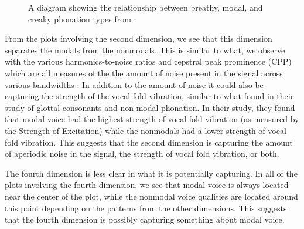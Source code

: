 \begin{figure}[h!]
    \centering
    \caption{A diagram showing the relationship between breathy, modal, and creaky phonation types from \citet{gordonPhonationTypesCrosslinguistic2001}.}
    \label{fig:phonation_types}
\end{figure}

From the plots involving the second dimension, we see that this dimension separates the modals from the nonmodals. This is similar to what, we observe with the various harmonics-to-noise ratios and cepstral peak prominence (CPP) which are all measures of the the amount of noise present in the signal across various bandwidths \citep{dekromCepstrumBasedTechniqueDetermining1993,hillenbrandAcousticCorrelatesBreathy1996,blankenshipTimingNonmodalPhonation2002,ferrerriesgoWhatMakesCepstral2020}. In addition to the amount of noise it could also be capturing the strength of the vocal fold vibration, similar to what \citet{garellekVoicingGlottalConsonants2021} found in their study of glottal consonants and non-modal phonation. In their study, they found that modal voice had the highest strength of vocal fold vibration (as measured by the Strength of Excitation) while the nonmodals had a lower strength of vocal fold vibration. This suggests that the second dimension is capturing the amount of aperiodic noise in the signal, the strength of vocal fold vibration, or both.

The fourth dimension is less clear in what it is potentially capturing. In all of the plots involving the fourth dimension, we see that modal voice is always located near the center of the plot, while the nonmodal voice qualities are located around this point depending on the patterns from the other dimensions. This suggests that the fourth dimension is possibly capturing something about modal voice. 

